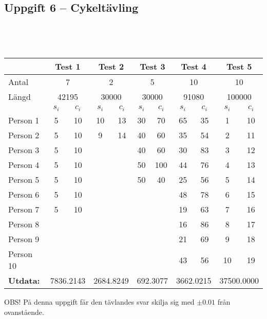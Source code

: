 \documentclass[a4paper,12pt,oneside]{amsbook}
\theoremstyle{test}
\newcommand{\fe}[1]{\textbf{#1}}            %
\begin{document}
\subsection*{Uppgift 6 -- Cykeltävling}
~\\
{\tt 
\begin{tabular}{||l||c|c||c|c||c|c||c|c||c|c||}\hline\hline
& \multicolumn{2}{c||}{\fe{Test 1}} & \multicolumn{2}{c||}{\fe{Test 2}}& \multicolumn{2}{c||}{\fe{Test 3}} & \multicolumn{2}{c||}{\fe{Test 4}} & \multicolumn{2}{c||}{\fe{Test 5}} \\\hline\hline
Antal & \multicolumn{2}{c||}{ 7 }& \multicolumn{2}{c||}{ 2} & \multicolumn{2}{c||}{ 5} & \multicolumn{2}{c||}{ 10}& \multicolumn{2}{c||}{ 10}\\ \hline
Längd& \multicolumn{2}{c||}{ 42195 }& \multicolumn{2}{c||}{ 30000} & \multicolumn{2}{c||}{ 30000} & \multicolumn{2}{c||}{ 91080}& \multicolumn{2}{c||}{ 100000}\\ \hline
& \fe{$s_i$} & \fe{$c_i$} & \fe{$s_i$} & \fe{$c_i$}& \fe{$s_i$} & \fe{$c_i$}& \fe{$s_i$} & \fe{$c_i$}& \fe{$s_i$} & \fe{$c_i$} \\ \hline
Person 1	&	5	&	10	&	10	&	13	&	30	&	70	&	65	&	35	&	1	&	10	\\
Person 2	&	5	&	10	&	9	&	14	&	40	&	60	&	35	&	54	&	2	&	11	\\
Person 3	&	5	&	10	&		&		&	40	&	60	&	30	&	83	&	3	&	12	\\
Person 4	&	5	&	10	&		&		&	50	&	100	&	44	&	76	&	4	&	13	\\
Person 5	&	5	&	10	&		&		&	50	&	40	&	25	&	56	&	5	&	14	\\
Person 6	&	5	&	10	&		&		&		&		&	48	&	78	&	6	&	15	\\
Person 7	&	5	&	10	&		&		&		&		&	19	&	63	&	7	&	16	\\
Person 8	&		&		&		&		&		&		&	16	&	86	&	8	&	17	\\
Person 9	&		&		&		&		&		&		&	21	&	69	&	9	&	18	\\
Person 10	&		&		&		&		&		&		&	43	&	56	&	10	&	19	\\ \hline\hline
\fe{Utdata:} & \multicolumn{2}{c||}{ 7836.2143 }& \multicolumn{2}{c||}{ 2684.8249} & \multicolumn{2}{c||}{ 692.3077} & \multicolumn{2}{c||}{ 3662.0215}& \multicolumn{2}{c||}{ 37500.0000} \\ \hline\hline
\end{tabular}
}

OBS! På denna uppgift får den tävlandes svar skilja sig med $\pm 0.01$ från ovanstående.
\end{document}
